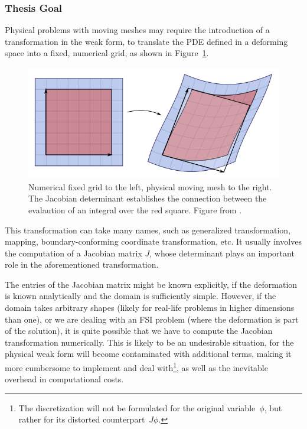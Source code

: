 \documentclass[thesis.tex]{subfiles}
\begin{document}
\subsubsection{Thesis Goal}
Physical problems with moving meshes may require 
the introduction of a transformation in the weak form,
to translate the PDE defined in a deforming space into a fixed, 
numerical grid, as shown in Figure~\ref{fig:jacobianTransformation}.
\begin{figure}[h]
    \includegraphics[width=\columnwidth]{research_project/piston/figures/Jacobian_determinant_and_distortion.png}
    \caption{Numerical fixed grid to the left, physical moving mesh to the right.
    The Jacobian determinant establishes the connection between 
    the evalaution of an integral over the red square.
    Figure from \cite{jacobianTransformation}.}
    \label{fig:jacobianTransformation}
\end{figure}

This transformation can take many names, 
such as generalized transformation, 
mapping,
boundary-conforming coordinate transformation,
etc.
It usually involves the computation of a Jacobian matrix $J$,
whose determinant plays an important role in the aforementioned transformation.

The entries of the Jacobian matrix might be known explicitly,
if the deformation is known analytically and the domain is sufficiently simple.
However, if the domain takes arbitrary shapes 
(likely for real-life problems in higher dimensions than one),
or we are dealing with an FSI problem (where the deformation is part of the solution),
it is quite possible that we have to compute the Jacobian transformation numerically.
This is likely to be an undesirable situation, 
for the physical weak form will become contaminated with additional terms, 
making it more cumbersome to implement and deal with\footnote{
    The discretization will not be formulated for the original variable~$\phi$,
    but rather for its distorted counterpart~$J \phi$.
    },
as well as the inevitable overhead in computational costs.
\end{document}
